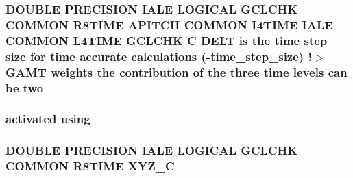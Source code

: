 \hypertarget{time_8com_a08a78256f7bf7006662ac6a5bf3eb786}{
\subsubsection[{two}]{\setlength{\rightskip}{0pt plus 5cm}D\-O\-U\-B\-L\-E P\-R\-E\-C\-I\-S\-I\-O\-N I\-A\-L\-E L\-O\-G\-I\-C\-A\-L G\-C\-L\-C\-H\-K C\-O\-M\-M\-O\-N R8\-T\-I\-M\-E {\bf A\-P\-I\-T\-C\-H} C\-O\-M\-M\-O\-N I4\-T\-I\-M\-E I\-A\-L\-E C\-O\-M\-M\-O\-N L4\-T\-I\-M\-E G\-C\-L\-C\-H\-K C {\bf D\-E\-L\-T} is the time {\bf step} size for time accurate calculations (-\/time\-\_\-step\-\_\-size) !$>$ {\bf G\-A\-M\-T} weights the contribution of the three time levels can be two}}\label{time_8com_a08a78256f7bf7006662ac6a5bf3eb786}
\hypertarget{time_8com_a6460305cce7c549ad9964e2a1f3f8dec}{
\subsubsection[{using}]{\setlength{\rightskip}{0pt plus 5cm}activated using}}\label{time_8com_a6460305cce7c549ad9964e2a1f3f8dec}
\hypertarget{time_8com_a1c3e27e3ce9b3b625cbf7df4bc15afd1}{
\subsubsection[{X\-Y\-Z\-\_\-\-C}]{\setlength{\rightskip}{0pt plus 5cm}D\-O\-U\-B\-L\-E P\-R\-E\-C\-I\-S\-I\-O\-N I\-A\-L\-E L\-O\-G\-I\-C\-A\-L G\-C\-L\-C\-H\-K C\-O\-M\-M\-O\-N R8\-T\-I\-M\-E X\-Y\-Z\-\_\-\-C}}\label{time_8com_a1c3e27e3ce9b3b625cbf7df4bc15afd1}
